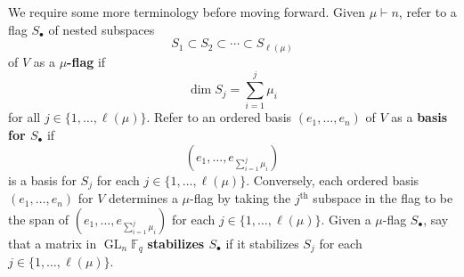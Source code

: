 \documentclass[Unicode,ALCO]{cedram}
\DeclareMathOperator{\GL}{GL}
\newcommand{\F}{\mathbb{F}}
\newcommand{\myemph}{\textbf}
\begin{document}
We require some more terminology before moving forward.
Given \(\mu \vdash n\), refer to a flag $S_\bullet$ of nested subspaces
$$ S_1 \subset S_2 \subset \cdots \subset S_{\ell(\mu)}$$
of $V$
as a \myemph{$\mu$-flag} if
$$\dim S_j = \sum_{i=1}^j \mu_i$$ for all $j \in \{1,\ldots,\ell(\mu)\}$.
Refer to an ordered basis $(e_1,\ldots,e_{n})$ of $V$ as a \myemph{basis for $S_\bullet$} if
$$ \left (e_1,\ldots,e_{\sum_{i=1}^j \mu_i} \right ) $$
is a basis for $S_j$ for each $j \in \{1,\ldots,\ell(\mu)\}$.
Conversely, each ordered basis \((e_1,\ldots,e_n)\) for \(V\) determines a \(\mu\)-flag by taking the \(j^\text{th}\) subspace in the flag to be the span of \(\left ( e_1,\ldots,e_{\sum_{i=1}^j \mu_i} \right )\) for each \(j \in \{1,\ldots,\ell(\mu)\}\).
Given a $\mu$-flag $S_\bullet$, say that a matrix in $\GL_{n} \F_q$ \myemph{stabilizes $S_\bullet$} if it stabilizes $S_j$ for each $j \in \{1,\ldots,\ell(\mu)\}$.
\end{document}
